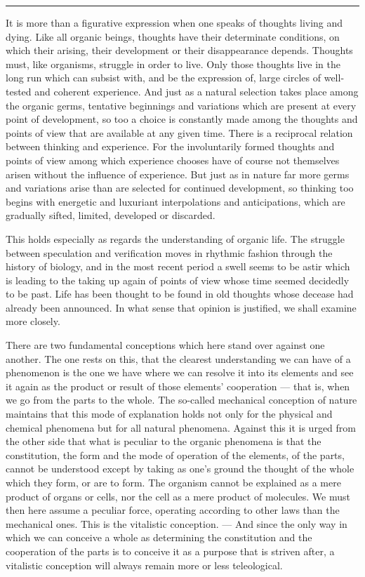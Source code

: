 \documentclass[12pt,a4paper,openany]{book}
\newcommand{\opage}[1]{\marginnote{\footnotesize\textit{[#1]}}}
\newcommand{\streg}{\begin{center}\rule{3em}{0.4pt}\end{center}}
\begin{document}
\streg{}

It is more than a figurative expression when one speaks
of thoughts living and dying. Like all organic beings,
thoughts have their determinate conditions, on which their
arising, their development or their disappearance depends. Thoughts
must, like organisms, struggle in order to live. Only those
thoughts live in the long run which can subsist with, and be the expression of,
large circles of well-tested and coherent experience. And just as a natural
selection takes place among the organic germs, tentative beginnings and
variations which are present at every point of development, so too a choice is
constantly made among the thoughts and points of view that are available at any
given time. There is a reciprocal relation between thinking and experience. For
the involuntarily formed thoughts and points of view among which experience
chooses have of course not themselves arisen without the influence of
experience. But just as in nature far more germs and variations arise than are
selected for continued development, so thinking too begins with energetic and
luxuriant interpolations and anticipations, which are gradually sifted, limited,
developed or discarded.

This holds especially as regards the understanding of organic life. The struggle
between speculation and verification moves in rhythmic fashion through the
history of biology, and in the most recent period a swell seems to be astir
which is leading to the taking up again of points of view whose time seemed
decidedly to be past. Life has been thought to be found in old thoughts
\opage{41}whose decease had already been announced. In what sense that opinion is
justified, we shall examine more closely.

There are two fundamental conceptions which here stand over against one another.
The one rests on this, that the clearest understanding we can have of a
phenomenon is the one we have where we can resolve it into its elements and see
it again as the product or result of those elements' cooperation --- that is,
when we go from the parts to the whole. The so-called mechanical conception of nature
maintains that this mode of explanation holds not only for the physical and
chemical phenomena but for all natural phenomena. Against this it is urged from
the other side that what is peculiar to the organic phenomena is that the
constitution, the form and the mode of operation of the elements, of the parts,
cannot be understood except by taking as one's ground the thought of the whole
which they form, or are to form. The organism cannot be explained as a mere
product of organs or cells, nor the cell as a mere product of molecules. We must
then here assume a peculiar force, operating according to other laws than the
mechanical ones. This is the vitalistic conception. --- And since the only way in
which we can conceive a whole as determining the constitution and the
cooperation of the parts is to conceive it as a purpose that is striven after,
a vitalistic conception will always remain more or less teleological.
\end{document}
